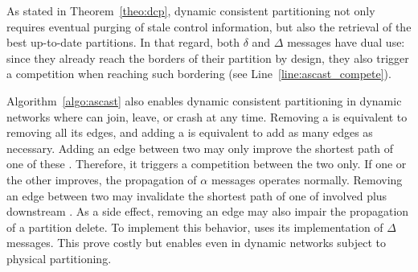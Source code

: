 As stated in Theorem~\ref{theo:dcp}, dynamic consistent partitioning
not only requires eventual purging of stale control information, but
also the retrieval of the best up-to-date partitions.  In that regard,
both $\delta$ and $\Delta$ messages have dual use: since they already
reach the borders of their partition by design, they also trigger a
competition when reaching such bordering \processes (see
Line~\ref{line:ascast_compete}).

Algorithm~\ref{algo:ascast} also enables dynamic consistent
partitioning in dynamic networks where \processes can join, leave, or
crash at any time. Removing a \process is equivalent to removing all
its edges, and adding a \process is equivalent to add as many edges as
necessary.  Adding an edge between two \processes may only improve the
shortest path of one of these \processes. Therefore, it triggers a
competition between the two \processes only. If one or the other
\process improves, the propagation of $\alpha$ messages operates
normally.  Removing an edge between two \processes may invalidate the
shortest path of one of involved \processes plus downstream
\processes. As a side effect, removing an edge may also impair the
propagation of a partition delete. To implement this behavior, \NAME
uses its implementation of $\Delta$ messages. This prove costly but
enables \NAME even in dynamic networks subject to physical
partitioning.

